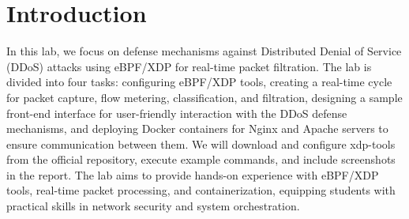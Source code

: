 \chapter{Introduction}\label{chap:introduction}

In this lab, we focus on defense mechanisms against Distributed Denial of Service (DDoS) attacks using eBPF/XDP for real-time packet filtration. 
The lab is divided into four tasks: configuring eBPF/XDP tools, creating a real-time cycle for packet capture, flow metering, classification, and filtration, designing a sample front-end interface for user-friendly interaction with the DDoS defense mechanisms, and deploying Docker containers for Nginx and Apache servers to ensure communication between them. We will download and configure xdp-tools from the official repository, execute example commands, and include screenshots in the report. The lab aims to provide hands-on experience with eBPF/XDP tools, real-time packet processing, and containerization, equipping students with practical skills in network security and system orchestration.
